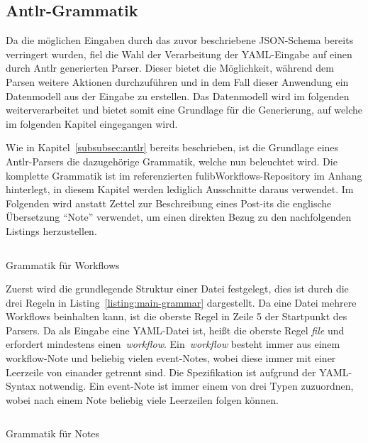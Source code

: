 \subsection{Antlr-Grammatik}\label{subsec:antlr-grammatik}
Da die möglichen Eingaben durch das zuvor beschriebene JSON-Schema bereits verringert wurden, fiel die Wahl der Verarbeitung der YAML-Eingabe auf einen durch Antlr generierten Parser.
Dieser bietet die Möglichkeit, während dem Parsen weitere Aktionen durchzuführen und in dem Fall dieser Anwendung ein Datenmodell aus der Eingabe zu erstellen.
Das Datenmodell wird im folgenden weiterverarbeitet und bietet somit eine Grundlage für die Generierung, auf welche im folgenden Kapitel eingegangen wird.

Wie in Kapitel~\ref{subsubsec:antlr} bereits beschrieben, ist die Grundlage eines Antlr-Parsers die dazugehörige Grammatik, welche nun beleuchtet wird.
Die komplette Grammatik ist im referenzierten fulibWorkflows-Repository im Anhang hinterlegt, in diesem Kapitel werden lediglich Ausschnitte daraus verwendet.
Im Folgenden wird anstatt Zettel zur Beschreibung eines Post-its die englische Übersetzung ``Note'' verwendet, um einen direkten Bezug zu den nachfolgenden Listings herzustellen.

\begin{listing}[!ht]
    \inputminted[firstnumber=5]{antlr-java}{listings/3.1.3/Main.g4}
    \caption{Grammatik für Workflows}
    \label{listing:main-grammar}
\end{listing}

Zuerst wird die grundlegende Struktur einer Datei festgelegt, dies ist durch die drei Regeln in Listing~\ref{listing:main-grammar} dargestellt.
Da eine Datei mehrere Workflows beinhalten kann, ist die oberste Regel in Zeile 5 der Startpunkt des Parsers.
Da als Eingabe eine YAML-Datei ist, heißt die oberste Regel \textit{file} und erfordert mindestens einen~\textit{workflow}.
Ein~\textit{workflow} besteht immer aus einem workflow-Note und beliebig vielen event-Notes, wobei diese immer mit einer Leerzeile von einander getrennt sind.
Die Spezifikation ist aufgrund der YAML-Syntax notwendig.
Ein event-Note ist immer einem von drei Typen zuzuordnen, wobei nach einem Note beliebig viele Leerzeilen folgen können.

\begin{listing}[!ht]
    \inputminted[firstnumber=11]{antlr-java}{listings/3.1.3/Note.g4}
    \caption{Grammatik für Notes}
    \label{listing:note-grammar}
\end{listing}

